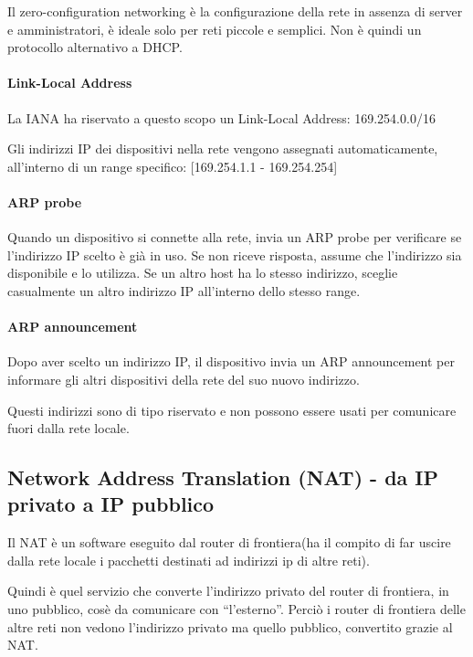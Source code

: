 Il zero-configuration networking è la configurazione della rete in assenza di server e amministratori, è ideale solo per reti piccole e semplici. Non è quindi un protocollo alternativo a DHCP.

\paragraph{Link-Local Address}
La IANA ha riservato a questo scopo un Link-Local Address: 169.254.0.0/16 

Gli indirizzi IP dei dispositivi nella rete vengono assegnati automaticamente, all'interno di un range specifico: [169.254.1.1 - 169.254.254]

\paragraph{ARP probe}
Quando un dispositivo si connette alla rete, invia un ARP probe per verificare se l'indirizzo IP scelto è già in uso. Se non riceve risposta, assume che l'indirizzo sia disponibile e lo utilizza. 
Se un altro host ha lo stesso indirizzo, sceglie casualmente un altro indirizzo IP all'interno dello stesso range.

\paragraph{ARP announcement}
Dopo aver scelto un indirizzo IP, il dispositivo invia un ARP announcement per informare gli altri dispositivi della rete del suo nuovo indirizzo. 

Questi indirizzi sono di tipo riservato e non possono essere usati per comunicare fuori dalla rete locale.



\subsection{Network Address Translation (NAT) - da IP privato a IP pubblico}


Il NAT è un software eseguito dal router di frontiera(ha il compito di far uscire dalla rete locale i pacchetti destinati ad indirizzi ip di altre reti).

Quindi è quel servizio che converte l'indirizzo privato del router di frontiera, in uno pubblico, cosè da comunicare con “l'esterno”. 
Perciò i router di frontiera delle altre reti non vedono l'indirizzo privato ma quello pubblico, convertito grazie al NAT.

